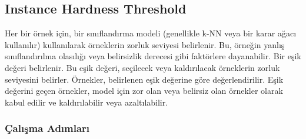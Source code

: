 \subsection{Instance Hardness Threshold}
Her bir örnek için, bir sınıflandırma modeli (genellikle k-NN veya bir karar ağacı kullanılır) kullanılarak örneklerin zorluk seviyesi belirlenir. Bu, örneğin yanlış sınıflandırılma olasılığı veya belirsizlik derecesi gibi faktörlere dayanabilir. Bir eşik değeri belirlenir. Bu eşik değeri, seçilecek veya kaldırılacak örneklerin zorluk seviyesini belirler. Örnekler, belirlenen eşik değerine göre değerlendirilir. Eşik değerini geçen örnekler, model için zor olan veya belirsiz olan örnekler olarak kabul edilir ve kaldırılabilir veya azaltılabilir.

\subsubsection{Çalışma Adımları}

